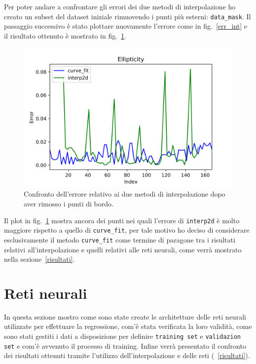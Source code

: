 \documentclass[12pt,a4paper,final]{book}
\begin{document}
Per poter andare a confrontare gli errori dei due metodi di interpolazione ho creato un subset del dataset iniziale rimuovendo i punti più esterni: \texttt{data\_mask}. Il passaggio successivo è stato plottare nuovamente l'errore come in fig.~\ref{err_int} e il risultato ottenuto è mostrato in fig.~\ref{err_int_mask}.

\begin{figure}[!ht]
	\centering
	\includegraphics[scale=0.8]{../figures/error_comparison.png}
	\caption{Confronto dell'errore relativo ai due metodi di interpolazione dopo aver rimosso i punti di bordo.}
	\label{err_int_mask}
\end{figure}

Il plot in fig.~\ref{err_int_mask} mostra ancora dei punti nei quali l'errore di \texttt{interp2d} è molto maggiore rispetto a quello di \texttt{curve\_fit}, per tale motivo ho deciso di considerare esclusivamente il metodo \texttt{curve\_fit} come termine di paragone tra i risultati relativi all'interpolazione e quelli relativi alle reti neurali, come verrà mostrato nella sezione~\ref{risultati}.


\section{Reti neurali}\label{reti_neurali}
In questa sezione mostro come sono state create le architetture delle reti neurali utilizzate per effettuare la regressione, com'è stata verificata la loro validità, come sono stati gestiti i dati a disposizione per definire \texttt{training set} e \texttt{validazion set} e com'è avvenuto il processo di training. Infine verrà presentato il confronto dei risultati ottenuti tramite l'utilizzo dell'interpolazione e delle reti (~\ref{risultati}).
\end{document}
